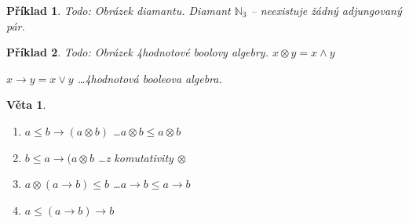 \documentclass[10pt, a4paper, titlepage]{article}
\theoremstyle{note}
\newtheorem{veta}{Věta}
\newtheorem{priklad}{Příklad}
\begin{document}
\begin{priklad}
Todo: Obrázek diamantu. Diamant $\mathbb{N}_{3}$ -- neexistuje žádný adjungovaný pár.
\end{priklad}
\begin{priklad}
Todo: Obrázek 4hodnotové boolovy algebry. $x\otimes y=x\wedge y$

$x\rightarrow y = x\vee y$ \dots 4hodnotová booleova algebra.
\end{priklad}
\begin{veta}
\begin{enumerate}
\renewcommand{\labelenumi}{(\alph{enumi})}
\item $a\leq b \rightarrow(a\otimes b)$ \dots $a\otimes b\leq a\otimes b$
\item $b\leq a \rightarrow(a\otimes b$ \dots z komutativity $\otimes$
\item $a\otimes (a\rightarrow b) \leq b$ \dots $a\rightarrow b\leq a\rightarrow b$
\item $a\leq (a\rightarrow b) \rightarrow b$
\end{enumerate}
\end{veta}

\renewcommand{\indexcolumns}{3}
\printindex
\end{document}
